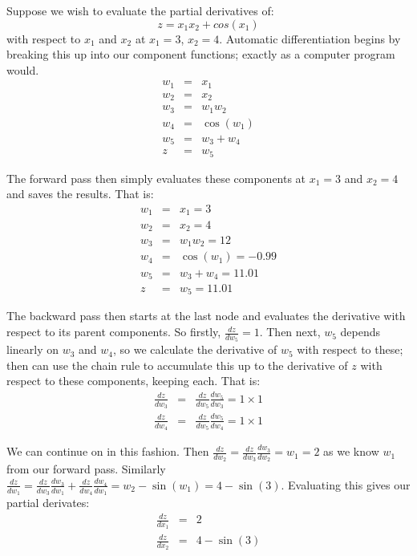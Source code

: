 Suppose we wish to evaluate the partial derivatives of:
\begin{equation}
	z = x_1 x_2 + cos(x_1)
\end{equation}
with respect to $x_1$ and $x_2$ at $x_1=3$, $x_2=4$.
Automatic differentiation begins by breaking this up into our component functions; exactly as a computer program would. 
\begin{eqnarray*}
	w_1 &=& x_1 \\
	w_2 &=& x_2 \\
	w_3 &=& w_1 w_2 \\
	w_4 &=& \cos\left(w_1\right) \\
	w_5 &=& w_3 + w_4 \\
	z &=& w_5
\end{eqnarray*}

The forward pass then simply evaluates these components at $x_1=3$ and $x_2=4$ and saves the results.
That is: 
\begin{eqnarray*}
	w_1 &=& x_1 = 3 \\
	w_2 &=& x_2 = 4\\
	w_3 &=& w_1 w_2 = 12 \\
	w_4 &=& \cos\left(w_1\right) = -0.99 \\
	w_5 &=& w_3 + w_4  = 11.01\\
	z &=& w_5 = 11.01
\end{eqnarray*}

The backward pass then starts at the last node and evaluates the derivative with respect to its parent components.
So firstly, $\frac{dz}{dw_5} = 1$.
Then next, $w_5$ depends linearly on $w_3$ and $w_4$, so we calculate the derivative of $w_5$ with respect to these; then can use the chain rule to accumulate this up to the derivative of $z$ with respect to these components, keeping each. 
That is:
\begin{eqnarray*}
	\frac{dz}{dw_3} &=& \frac{dz}{dw_5}\frac{dw_5}{dw_3} = 1 \times 1 \\
	\frac{dz}{dw_4} &=& \frac{dz}{dw_5}\frac{dw_5}{dw_4} = 1 \times 1
\end{eqnarray*}

We can continue on in this fashion.
Then $\frac{dz}{dw_2} = \frac{dz}{dw_3}\frac{dw_3}{dw_2} = w_1 = 2$ as we know $w_1$ from our forward pass.
Similarly $\frac{dz}{dw_1} = \frac{dz}{dw_3}\frac{dw_3}{dw_1} +  \frac{dz}{dw_4}\frac{dw_4}{dw_1}= w_2 - \sin(w_1)= 4 - \sin(3)$.
Evaluating this gives our partial derivates:
\begin{eqnarray*}
	\frac{dz}{dx_1} &=& 2 \\
	\frac{dz}{dx_2} &=& 4 - \sin(3)
\end{eqnarray*}

